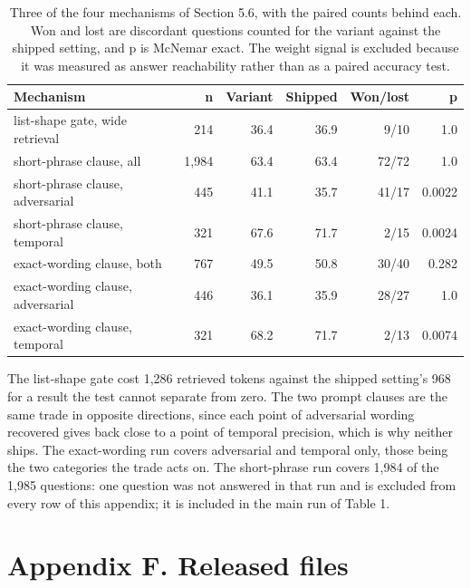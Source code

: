 \documentclass[10pt,a4paper,twocolumn]{article}
\begin{document}
\begin{table}[tb]
\centering
\caption{Three of the four mechanisms of Section 5.6, with the paired counts behind each. Won and lost are discordant questions counted for the variant against the shipped setting, and p is McNemar exact. The weight signal is excluded because it was measured as answer reachability rather than as a paired accuracy test.}\label{table:neg}
\scriptsize
\begin{tabular}{lrrrrr}
\toprule
Mechanism & n & Variant & Shipped & Won/lost & p \\
\midrule
list-shape gate, wide retrieval & 214 & 36.4 & 36.9 & 9/10 & 1.0 \\
short-phrase clause, all & 1,984 & 63.4 & 63.4 & 72/72 & 1.0 \\
short-phrase clause, adversarial & 445 & 41.1 & 35.7 & 41/17 & 0.0022 \\
short-phrase clause, temporal & 321 & 67.6 & 71.7 & 2/15 & 0.0024 \\
exact-wording clause, both & 767 & 49.5 & 50.8 & 30/40 & 0.282 \\
exact-wording clause, adversarial & 446 & 36.1 & 35.9 & 28/27 & 1.0 \\
exact-wording clause, temporal & 321 & 68.2 & 71.7 & 2/13 & 0.0074 \\
\bottomrule
\end{tabular}
\end{table}

The list-shape gate cost 1,286 retrieved tokens against the shipped setting's 968 for a result the test cannot separate from zero. The two prompt clauses are the same trade in opposite directions, since each point of adversarial wording recovered gives back close to a point of temporal precision, which is why neither ships. The exact-wording run covers adversarial and temporal only, those being the two categories the trade acts on. The short-phrase run covers 1,984 of the 1,985 questions: one question was not answered in that run and is excluded from every row of this appendix; it is included in the main run of Table 1.

\section*{Appendix F. Released files}
\end{document}
